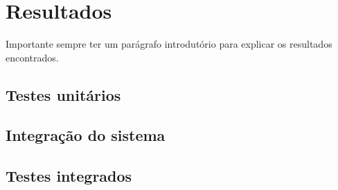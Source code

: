 \chapter{Resultados}
\label{chap:result}
Importante sempre ter um parágrafo introdutório para explicar os 
resultados encontrados.

\section{Testes unitários}
\label{sec:testu}
\lipsum[1]

\section{Integração do sistema}
\label{sec:intsis}
\lipsum[1]

\section{Testes integrados}
\label{sec:testi}
\lipsum[1]







